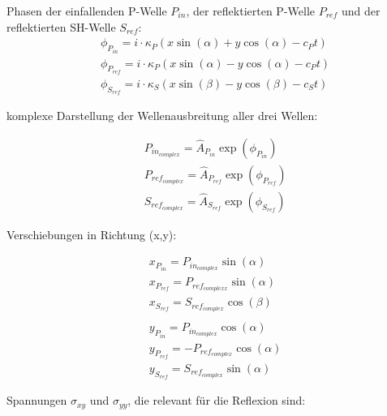\begin{solution}
    Phasen der einfallenden P-Welle $P_{in}$, der reflektierten P-Welle $P_{ref}$ und der reflektierten SH-Welle $S_{ref}$:
    \begin{align*}
            &\phi_{P_{in}} = \textit{i} \cdot \kappa_P (x \sin(\alpha) + y \cos(\alpha) - c_P t) \\
            &\phi_{P_{ref}} = \textit{i} \cdot \kappa_P (x \sin(\alpha) - y \cos(\alpha) - c_P t) \\
            &\phi_{S_{ref}} = \textit{i} \cdot \kappa_S (x \sin(\beta) - y \cos(\beta) - c_S t)
    \end{align*}

    komplexe Darstellung der Wellenausbreitung aller drei Wellen:

    \begin{align*}
        &P_{in_{complex}} = \hat{A}_{P_{in}} \exp(\phi_{P_{in}}) \\
        &P_{ref_{complex}} = \hat{A}_{P_{ref}} \exp(\phi_{P_{ref}}) \\
        &S_{ref_{complex}} = \hat{A}_{S_{ref}} \exp(\phi_{S_{ref}})
    \end{align*}

    Verschiebungen in Richtung (x,y):

    \begin{align*}
        &x_{P_{in}} = P_{in_{complex}} \sin(\alpha) \\
        &x_{P_{ref}} = P_{ref_{complexx}} \sin(\alpha) \\
        &x_{S_{ref}} = S_{ref_{complex}} \cos(\beta) \\
        \\
        &y_{P_{in}} = P_{in_{complex}} \cos(\alpha) \\
        &y_{P_{ref}} = - P_{ref_{complex}} \cos(\alpha) \\
        &y_{S_{ref}} = S_{ref_{complex}} \sin(\alpha)
    \end{align*}

    Spannungen $\sigma_{xy}$ und $\sigma_{yy}$, die relevant für die Reflexion sind:


\end{solution}
